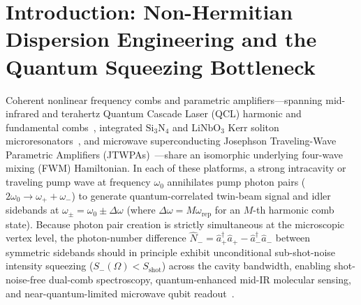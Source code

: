 \documentclass[11pt,letterpaper]{article}
\theoremstyle{definition}
\theoremstyle{remark}
\begin{document}
\begin{abstract}
$\mathrm{NbTiN}$ JTWPAs) and lowering the shot-noise crossover frequency from $980\,\mathrm{MHz}$ to $1.8\,\mathrm{MHz}$.
\end{abstract}

\section{Introduction: Non-Hermitian Dispersion Engineering and the Quantum Squeezing Bottleneck}
\label{sec:intro}

Coherent nonlinear frequency combs and parametric amplifiers—spanning mid-infrared and terahertz Quantum Cascade Laser (QCL) harmonic and fundamental combs~\cite{Hugi2012,Burghoff2014,Faist2016,Kazakov2017,Piccardo2020,GabbrielliRoadmap2025,SilvestriRoadmap2025}, integrated $\mathrm{Si_3N_4}$ and $\mathrm{LiNbO_3}$ Kerr soliton microresonators~\cite{Kippenberg2018,Vahala2020}, and microwave superconducting Josephson Traveling-Wave Parametric Amplifiers (JTWPAs)~\cite{Macklin2015,Planat2020,Esposito2021}—share an isomorphic underlying four-wave mixing (FWM) Hamiltonian. In each of these platforms, a strong intracavity or traveling pump wave at frequency $\omega_0$ annihilates pump photon pairs ($2\omega_0 \to \omega_+ + \omega_-$) to generate quantum-correlated twin-beam signal and idler sidebands at $\omega_\pm = \omega_0 \pm \Delta\omega$ (where $\Delta\omega = M\omega_{\mathrm{rep}}$ for an $M$-th harmonic comb state). Because photon pair creation is strictly simultaneous at the microscopic vertex level, the photon-number difference $\hat{N}_- = \hat{a}_+^\dagger \hat{a}_+ - \hat{a}_-^\dagger \hat{a}_-$ between symmetric sidebands should in principle exhibit unconditional sub-shot-noise intensity squeezing ($S_-(\Omega) < S_{\mathrm{shot}}$) across the cavity bandwidth, enabling shot-noise-free dual-comb spectroscopy, quantum-enhanced mid-IR molecular sensing, and near-quantum-limited microwave qubit readout~\cite{GabbrielliRoadmap2025,Dutt2015,Chembo2016}.
\end{document}

